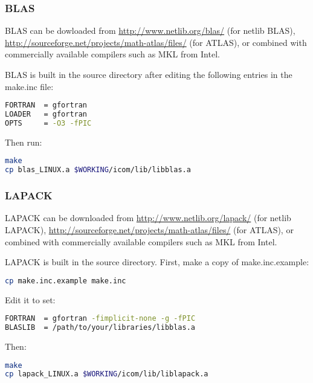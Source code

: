 \subsubsection{BLAS}
\label{sect:required_libraries_numerical_blas}

BLAS can be dowloaded from \url{http://www.netlib.org/blas/} (for netlib BLAS),
\url{http://sourceforge.net/projects/math-atlas/files/} (for ATLAS), or
combined with commercially available compilers such as MKL from Intel.

BLAS is built in the source directory after editing the following entries in
the make.inc file:

\begin{lstlisting}[language=bash]
FORTRAN  = gfortran
LOADER   = gfortran
OPTS     = -O3 -fPIC
\end{lstlisting}

Then run:

\begin{lstlisting}[language=bash]
make
cp blas_LINUX.a $WORKING/icom/lib/libblas.a
\end{lstlisting}

\subsubsection{LAPACK}
\label{sect:required_libraries_numerical_lapack}

LAPACK can be downloaded from \url{http://www.netlib.org/lapack/} (for netlib
LAPACK), \url{http://sourceforge.net/projects/math-atlas/files/} (for ATLAS),
or combined with commercially available compilers such as MKL from Intel. 

LAPACK is built in the source directory. First, make a copy of
make.inc.example:

\begin{lstlisting}[language=bash]
cp make.inc.example make.inc
\end{lstlisting}

Edit it to set:

\begin{lstlisting}[language=bash]
FORTRAN  = gfortran -fimplicit-none -g -fPIC
BLASLIB  = /path/to/your/libraries/libblas.a
\end{lstlisting}

Then:

\begin{lstlisting}[language=bash]
make
cp lapack_LINUX.a $WORKING/icom/lib/liblapack.a
\end{lstlisting}

